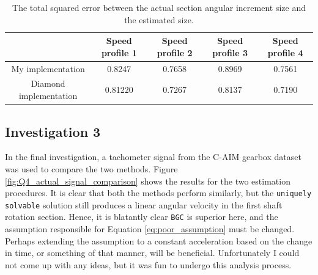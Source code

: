 \documentclass{article}
\begin{document}
	\begin{table}[]
		\centering
		\caption{The total squared error between the actual section angular increment size and the estimated size.}
		\label{tab:total_squared_error}
		\begin{tabular}{@{}ccccc@{}}
			\toprule
			& Speed profile 1 & Speed profile 2 & Speed profile 3 & Speed profile 4 \\ \midrule
			My implementation & 0.8247 & 0.7658 & 0.8969 & 0.7561 \\
			Diamond implementation & 0.81220 & 0.7267 & 0.8137 & 0.7190 \\ \bottomrule
		\end{tabular}
	\end{table}
	
	\subsection{Investigation 3}
	In the final investigation, a tachometer signal from the C-AIM gearbox dataset was used to compare the two methods. Figure \ref{fig:Q4_actual_signal_comparison} shows the results for the two estimation procedures. It is clear that both the methods perform similarly, but the \texttt{uniquely solvable} solution still produces a linear angular velocity in the first shaft rotation section. Hence, it is blatantly clear \texttt{BGC} is superior here, and the assumption responsible for Equation \eqref{eq:poor_assumption} must be changed. Perhaps extending the assumption to a constant acceleration based on the change in time, or something of that manner, will be beneficial. Unfortunately I could not come up with any ideas, but it was fun to undergo this analysis process.
\end{document}
